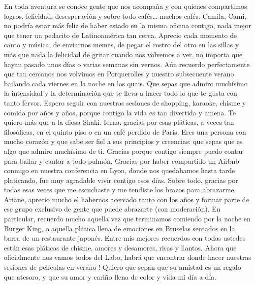 \vspace{5mm}

En toda aventura se conoce gente que nos acompaña y con quienes compartimos logros, felicidad, desesperación y sobre todo cafés… muchos cafés. Camila, Cami, no podría estar más feliz de haber estado en la misma oficina contigo, nada mejor que tener un pedacito de Latinoamérica tan cerca. Aprecio cada momento de canto y música, de enviarnos memes, de pegar el rostro del otro en las sillas y más que nada la felicidad de gritar cuando nos volvemos a ver, no importa que hayan pasado unos días o varias semanas sin vernos. Aún recuerdo perfectamente que tan cercanos nos volvimos en Porquerolles y nuestro subsecuente verano bailando cada viernes en la noche en los quais. Que sepas que admiro muchísimo la intensidad y la determinación que te lleva a hacer todo lo que te gusta con tanto fervor. Espero seguir con nuestras sesiones de shopping, karaoke, chisme y comida por años y años, porque contigo la vida es tan divertida y amena. Te quiero más que a la diosa Shaki.
Iqraa, gracias por esas pláticas, a veces tan filosóficas, en el quinto piso o en un café perdido de Paris. Eres una persona con mucho corazón y que sabe ser fiel a sus principios y creencias: que sepas que es algo que admiro muchísimo de ti. Gracias porque contigo siempre puedo contar para bailar y cantar a todo pulmón. Gracias por haber compartido un Airbnb conmigo en nuestra conferencia en Lyon, donde nos quedabamos hasta tarde platicando, fue muy agradable vivir contigo esos días. Sobre todo, gracias por todas esas veces que me escuchaste y me tendiste los brazos para abrazarme. 
Ariane, aprecio mucho el habernos acercado tanto con los años y formar parte de ese grupo exclusivo de gente que puede abrazarte (con moderación). En particular, recuerdo mucho aquella vez que terminamos comiendo por la noche en Burger King, o aquella plática llena de emociones en Bruselas sentados en la barra de un restaurante japonés. 
Entre mis mejores recuerdos con todas ustedes están esas pláticas de chisme, amores y desamores, risas y llantos. 
Ahora que oficialmente nos vamos todos del Labo, habrá que encontrar donde hacer nuestras sesiones de películas en verano !
Quiero que sepan que su amistad es un regalo que atesoro, y que su amor y cariño llena de color y vida mi día a día.

